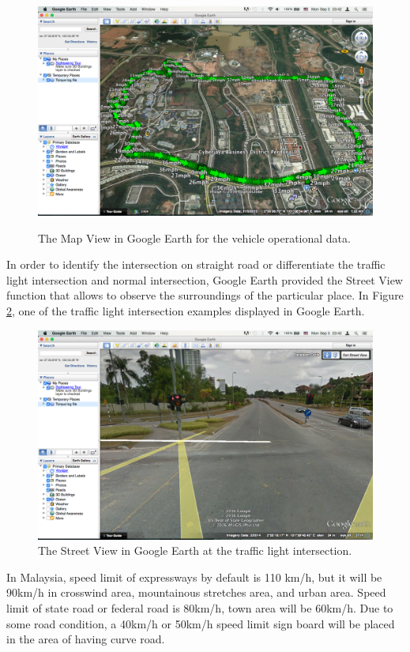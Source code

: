 \begin{figure}[hbt!]\centering
\includegraphics[width=.75\textwidth]{image/GEMapView}
\label{fig:GEMap}
\caption{The Map View in Google Earth for the vehicle operational data.}
\end{figure}

In order to identify the intersection on straight road or differentiate the traffic light intersection and normal intersection, Google Earth provided the Street View function that allows to observe the surroundings of the particular place. In Figure \ref{fig:GEStreet}, one of the traffic light intersection examples displayed in Google Earth. 

\begin{figure}[hbt!]\centering
\includegraphics[width=.75\textwidth]{image/GEStreetView}
\caption{The Street View in Google Earth at the traffic light intersection.}
\label{fig:GEStreet}
\end{figure}

In Malaysia, speed limit of expressways by default is 110 km/h, but it will be 90km/h in crosswind area, mountainous stretches area, and urban area. Speed limit of state road or federal road is 80km/h, town area will be 60km/h. Due to some road condition, a 40km/h or 50km/h speed limit sign board will be placed in the area of having curve road. 

